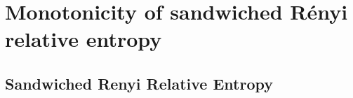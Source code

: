 \chapter{Monotonicity of sandwiched Rényi relative entropy}

\section{Sandwiched Renyi Relative Entropy}
